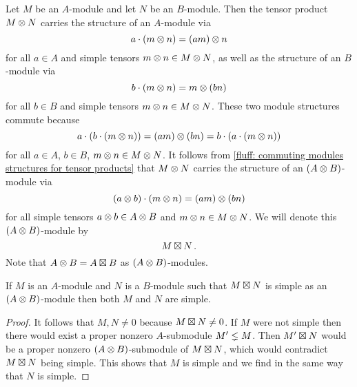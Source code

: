 \begin{fluff}
  \label{fluff: construction of boxtimes}
  Let $M$ be an $A$-module and let $N$ be an $B$-module.
  Then the tensor product $M \mathbin{\otimes} N$ carries the structure of an $A$-module via
  \[
      a \cdot (m \mathbin{\otimes} n)
    = (am) \mathbin{\otimes} n
  \]
  for all $a \in A$ and simple tensors $m \mathbin{\otimes} n \in M \mathbin{\otimes} N$, as well as the structure of an $B$-module via
  \[
      b \cdot (m \mathbin{\otimes} n)
    = m \mathbin{\otimes} (bn)
  \]
  for all $b \in B$ and simple tensors $m \mathbin{\otimes} n \in M \mathbin{\otimes} N$.
  These two module structures commute because
  \[
      a \cdot (b \cdot (m \mathbin{\otimes} n))
    = (am) \mathbin{\otimes} (bn)
    = b \cdot (a \cdot (m \mathbin{\otimes} n))
  \]
  for all $a \in A$, $b \in B$, $m \mathbin{\otimes} n \in M \mathbin{\otimes} N$.
  It follows from \ref{fluff: commuting modules structures for tensor products} that $M \mathbin{\otimes} N$ carries the structure of an $(A \mathbin{\otimes} B)$-module via
  \[
      (a \mathbin{\otimes} b) \cdot (m \mathbin{\otimes} n)
    = (am) \mathbin{\otimes} (bn)
  \]
  for all simple tensors $a \mathbin{\otimes} b \in A \mathbin{\otimes} B$ and $m \mathbin{\otimes} n \in M \mathbin{\otimes} N$.
  We will denote this $(A \mathbin{\otimes} B)$-module by
  \[
    M \mathbin{\boxtimes} N \,.
  \]
  Note that $A \mathbin{\otimes} B = A \mathbin{\boxtimes} B$ as $(A \mathbin{\otimes} B)$-modules.
\end{fluff}


\begin{lemma}
  \label{lemma: if product is simple then so are factors}
  If $M$ is an $A$-module and $N$ is a $B$-module such that $M \mathbin{\boxtimes} N$ is simple as an $(A \mathbin{\otimes} B)$-module then both $M$ and $N$ are simple.
\end{lemma}


\begin{proof}
  It follows that $M, N \neq 0$ because $M \mathbin{\boxtimes} N \neq 0$.
  If $M$ were not simple then there would exist a proper nonzero $A$-submodule $M' \lneq M$.
  Then $M' \mathbin{\boxtimes} N$ would be a proper nonzero $(A \mathbin{\otimes} B)$-submodule of $M \mathbin{\boxtimes} N$, which would contradict $M \mathbin{\boxtimes} N$ being simple.
  This shows that $M$ is simple and we find in the same way that $N$ is simple.
\end{proof}


